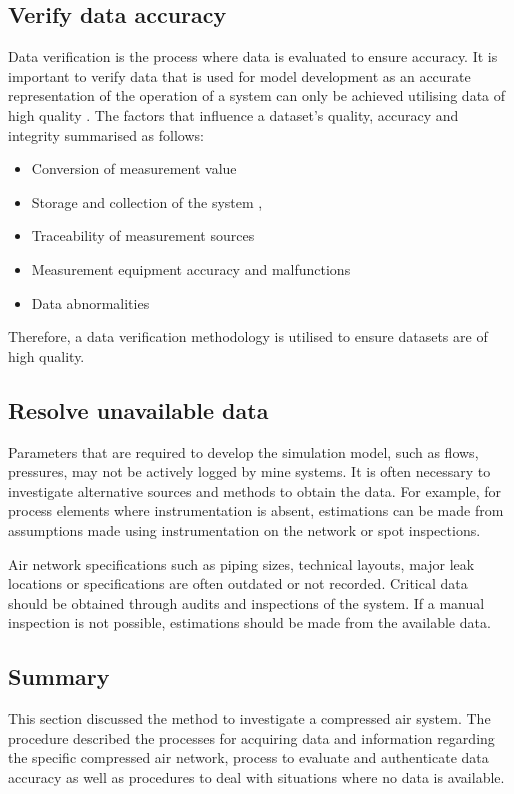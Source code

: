 	\subsection{Verify data accuracy}
	Data verification is the process where data is evaluated to ensure accuracy. It is important to verify data that is used for model development as an accurate representation of the operation of a system can only be achieved utilising data of high quality \cite{gous2016data}. The factors that influence a dataset's quality, accuracy and integrity summarised as follows:
	\begin{itemize}
		\item Conversion of measurement value \cite{meijsen2015verification}
		\item Storage and collection of the system \cite{vanNiekerk2016quantification},\cite{Jansevan2016structuring}
		\item Traceability of measurement sources \cite{Jansevan2016structuring}
		\item Measurement equipment accuracy and malfunctions \cite{gous2016data}
		\item Data abnormalities \cite{gous2016data}
	\end{itemize} 
	\par 
	Therefore, a data verification methodology is utilised to ensure datasets are of high quality. 
	\subsection{Resolve unavailable data}
		Parameters that are required to develop the simulation model, such as flows, pressures, may not be actively logged by mine systems. It is often necessary to investigate alternative sources and methods to obtain the data. For example, for process elements where instrumentation is absent, estimations can be made from assumptions made using instrumentation on the network or spot inspections.
		\par 
		Air network specifications such as piping sizes, technical layouts, major leak locations or specifications are often outdated or not recorded. Critical data should be obtained through audits and inspections of the system. If a manual inspection is not possible, estimations should be made from the available data. %
	
	\subsection{Summary}	
	This section discussed the method to investigate a compressed air system. The procedure described the processes for acquiring data and information regarding the specific compressed air network, process to evaluate and authenticate data accuracy as well as procedures to deal with situations where no data is available.
